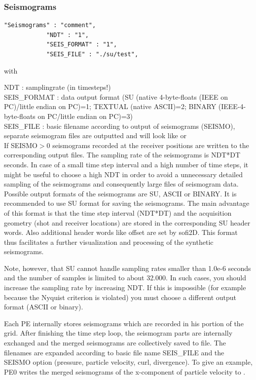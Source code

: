 \documentclass[11pt,onecolumn,oneside]{article}
\begin{document}
\subsubsection{Seismograms}
\label{seismograms}
\begin{verbatim}
"Seismograms" : "comment",
			"NDT" : "1",
			"SEIS_FORMAT" : "1",
			"SEIS_FILE" : "./su/test",
\end{verbatim}

with

NDT : samplingrate (in timesteps!)\\
SEIS\_FORMAT : data output format (SU (native 4-byte-floats (IEEE on PC)/little endian on PC)=1; TEXTUAL (native ASCII)=2; BINARY (IEEE-4-byte-floats on PC/little endian on PC)=3)\\
SEIS\_FILE : basic filename according to output of seismograms (SEISMO), separate seismogram files are outputted and will look like  or \\


If SEISMO$>$0 seismograms recorded at the receiver positions are written to the corresponding output files. The sampling rate of the seismograms is NDT*DT seconds. In case of a small time step interval and a high number of time steps, it might be useful to choose a high NDT in order to avoid a unnecessary detailed sampling of the seismograms and consequently large files of seismogram data. Possible output formats of the seismograms are SU, ASCII or BINARY. It is recommended to use SU format for saving the seismograms. The main advantage of this format is that the time step interval (NDT*DT) and the acquisition geometry (shot and receiver locations) are stored in the corresponding SU header words. Also additional header words like offset are set by sofi2D. This format thus facilitates a further visualization and processing of the synthetic seismograms.

Note, however, that SU cannot handle sampling rates smaller than 1.0e-6 seconds and the number of samples is limited to about 32.000. In such cases, you should increase the sampling rate by increasing NDT. If this is impossible (for example because the Nyquist criterion is violated) you must choose a different output format (ASCII or binary).

Each PE internally stores seismograms which are recorded in his portion of the grid. After finishing the time step loop, the seismogram parts are internally exchanged and the merged seismograms are collectively saved to file. The filenames are expanded according to basic file name SEIS\_FILE and the SEISMO option (pressure, particle velocity, curl, divergence). To give an example, PE0 writes the merged seismograms of the x-component of particle velocity to . 
\end{document}
